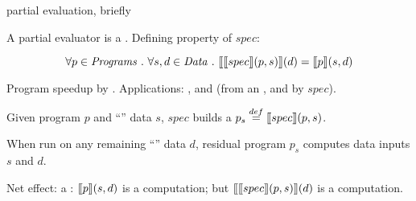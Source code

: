 \documentclass[12pt,fleqn,landscape]{article}
\begin{document}
\begin{slide}{partial evaluation, briefly}

A partial evaluator is a . Defining property of $spec$:

$$
\forall p\in \mathit{Programs}\ .\ \forall s, d \in \mathit{Data}\ . \ 
\lsem \lsem spec\rsem (p, s)\rsem (d) = \lsem p\rsem (s, d)
$$


\bi

\item Program speedup by .
Applications: , and  (from an ,
and by \vertt{self-applying}  $\mathit{spec}$).


\item Given program $p$ and ``'' data $s$, $\mathit{spec}$ builds a  $p_s \stackrel{def}{=} \mbox{$\lbrack\hspace{-0.3ex}\lbrack$} spec\mbox{$\rbrack\hspace{-0.3ex}\rbrack$} (p, s)$. 

\item When run on any remaining ``'' data $d$, residual program $p_s$ computes  data inputs $s$ and $d$.
\vair\vair

\item Net effect: a :  $\mbox{$\lbrack\hspace{-0.3ex}\lbrack$} p\mbox{$\rbrack\hspace{-0.3ex}\rbrack$} (s, d)$ is a  computation; but $\mbox{$\lbrack\hspace{-0.3ex}\lbrack$} \mbox{$\lbrack\hspace{-0.3ex}\lbrack$} spec\mbox{$\rbrack\hspace{-0.3ex}\rbrack$} (p, s)\mbox{$\rbrack\hspace{-0.3ex}\rbrack$} (d)$ is a   computation.
\vair

\item {}

\item {}

\ei
\end{slide}

\end{document}
